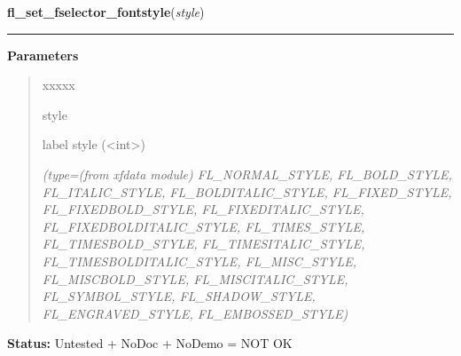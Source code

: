 \hspace{.8\funcindent}\begin{boxedminipage}{\funcwidth}

    \raggedright \textbf{fl\_set\_fselector\_fontstyle}(\textit{style})

    \vspace{-1.5ex}

    \rule{\textwidth}{0.5\fboxrule}
\setlength{\parskip}{2ex}
\setlength{\parskip}{1ex}
      \textbf{Parameters}
      \vspace{-1ex}

      \begin{quote}
        \begin{Ventry}{xxxxx}

          \item[style]

          label style ({\textless}int{\textgreater})

            {\it (type=(from xfdata module) FL\_NORMAL\_STYLE, FL\_BOLD\_STYLE, FL\_ITALIC\_STYLE,
FL\_BOLDITALIC\_STYLE, FL\_FIXED\_STYLE, FL\_FIXEDBOLD\_STYLE, 
FL\_FIXEDITALIC\_STYLE, FL\_FIXEDBOLDITALIC\_STYLE, FL\_TIMES\_STYLE, 
FL\_TIMESBOLD\_STYLE, FL\_TIMESITALIC\_STYLE, FL\_TIMESBOLDITALIC\_STYLE, 
FL\_MISC\_STYLE, FL\_MISCBOLD\_STYLE, FL\_MISCITALIC\_STYLE, 
FL\_SYMBOL\_STYLE, FL\_SHADOW\_STYLE, FL\_ENGRAVED\_STYLE, 
FL\_EMBOSSED\_STYLE)}

        \end{Ventry}

      \end{quote}

\textbf{Status:} Untested + NoDoc + NoDemo = NOT OK



    \end{boxedminipage}

    \label{xformslib:library:fl_set_fselector_placement}

    \vspace{0.5ex}

